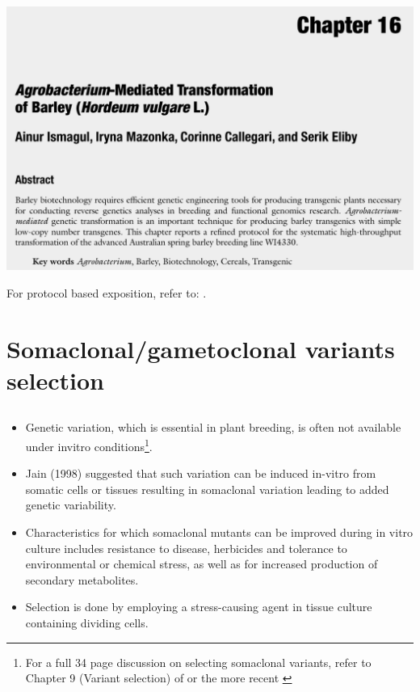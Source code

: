 \documentclass[
  ignorenonframetext,
  aspectratio=169]{beamer}
\providecommand{\tightlist}{%
  \setlength{\itemsep}{0pt}\setlength{\parskip}{0pt}}
\begin{document}
\hypertarget{section-12}{%
\subsection{}\label{section-12}}

\begin{frame}{}
\begin{center}\includegraphics[width=0.55\linewidth]{../images/protocol_agrobacterium_mediated_transformation} \end{center}

For protocol based exposition, refer to:
\citet{ismagul2014agrobacterium}.
\end{frame}

\hypertarget{somaclonalgametoclonal-variants-selection}{%
\section{Somaclonal/gametoclonal variants
selection}\label{somaclonalgametoclonal-variants-selection}}

\hypertarget{section-13}{%
\subsection{}\label{section-13}}

\begin{frame}{}
\begin{itemize}
\tightlist
\item
  Genetic variation, which is essential in plant breeding, is often not
  available under invitro
  conditions\footnote[frame]{For a full 34 page discussion on selecting somaclonal variants, refer to Chapter 9 (Variant selection) of \cite{bhojwani1986plant} or the more recent \cite{bhojwani2013plant}}.
\item
  Jain (1998) suggested that such variation can be induced in-vitro from
  somatic cells or tissues resulting in somaclonal variation leading to
  added genetic variability.
\item
  Characteristics for which somaclonal mutants can be improved during in
  vitro culture includes resistance to disease, herbicides and tolerance
  to environmental or chemical stress, as well as for increased
  production of secondary metabolites.
\item
  Selection is done by employing a stress-causing agent in tissue
  culture containing dividing cells.
\end{itemize}
\end{frame}
\end{document}
